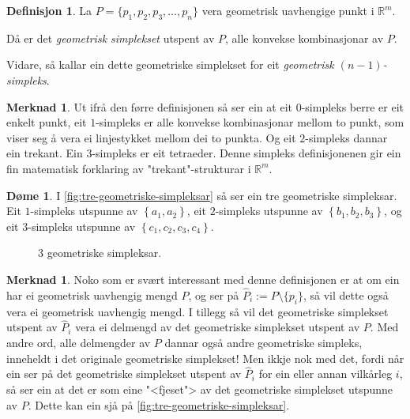 \documentclass[a4paper, 12pt, norsk]{article}
\theoremstyle{plain}
\theoremstyle{definition}
\newtheorem{definition}[theorem]{Definisjon}
\newtheorem{example}[theorem]{Døme}
\newtheorem{remark}[theorem]{Merknad}
\newcommand{\Rb}{\mathbb{R}}
\newcommand{\set}[1]{ \left\{ #1 \right\} } %
\begin{document}
\begin{definition}
	La $P=\{p_1, p_2, p_3, \dots, p_n\}$ vera geometrisk uavhengige punkt i $\Rb^m$.

	Då er det \emph{geometrisk simplekset} utspent av \( P \), alle konvekse kombinasjonar av $P$.
	
	Vidare, så kallar ein dette geometriske simplekset for eit \emph{geometrisk $(n-1)$-simpleks}.
\end{definition}

\begin{remark}
	Ut ifrå den førre definisjonen så ser ein at eit $0$-simpleks berre er eit enkelt punkt, eit $1$-simpleks er alle konvekse kombinasjonar mellom to punkt, som viser seg å vera ei linjestykket mellom dei to punkta. Og eit $2$-simpleks dannar ein trekant. Ein $3$-simpleks er eit tetraeder. Denne simpleks definisjonenen gir ein fin matematisk forklaring av "trekant"-strukturar i $\Rb^m$.
\end{remark}

\begin{example}
	 I \autoref{fig:tre-geometriske-simpleksar} så ser ein tre geometriske simpleksar. Eit \( 1 \)-simpleks utspunne av \( \set{a_1, a_2} \), eit \(2\)-simpleks utspunne av \( \set{b_1, b_2, b_3} \), og eit \(3\)-simpleks utspunne av \( \set{c_1, c_2, c_3, c_4} \).
	\begin{figure}[htbp]
		\begin{center}
			
			\caption{3 geometriske simpleksar.}
			\label{fig:tre-geometriske-simpleksar}
		\end{center}
	\end{figure}
\end{example}

\begin{remark}
	Noko som er svært interessant med denne definisjonen er at om ein har ei geometrisk uavhengig mengd $P$, og ser på $\hat{P}_i := P \setminus \{p_i\}$, så vil dette også vera ei geometrisk uavhengig mengd. I tillegg så vil det geometriske simplekset utspent av $\hat{P}_i$ vera ei delmengd av det geometriske simplekset utspent av $P$. Med andre ord, alle delmengder av $P$ dannar også andre geometriske simpleks, inneheldt i det originale geometriske simplekset! Men ikkje nok med det, fordi når ein ser på det geometriske simplekset utspent av $\hat{P}_i$ for ein eller annan vilkårleg $i$, så ser ein at det er som eine "<fjeset"> av det geometriske simplekset utspunne av $P$. Dette kan ein sjå på \autoref{fig:tre-geometriske-simpleksar}.
\end{remark}
\end{document}
